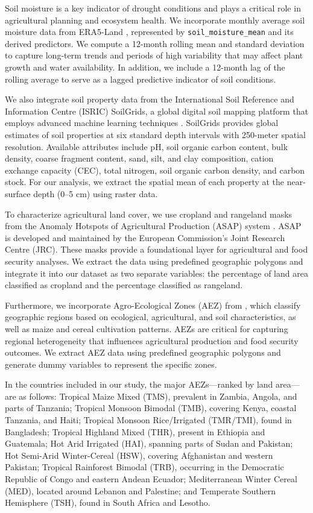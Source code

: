\documentclass[pdflatex,sn-mathphys-num]{sn-jnl}%
\theoremstyle{thmstyleone}%
\theoremstyle{thmstyletwo}%
\theoremstyle{thmstylethree}%
\begin{document}
Soil moisture is a key indicator of drought conditions and plays a critical role in agricultural planning and ecosystem health. We incorporate monthly average soil moisture data from ERA5-Land \cite{ECMWF_ERA5Land}, represented by \texttt{soil\_moisture\_mean} and its derived predictors. We compute a 12-month rolling mean and standard deviation to capture long-term trends and periods of high variability that may affect plant growth and water availability. In addition, we include a 12-month lag of the rolling average to serve as a lagged predictive indicator of soil conditions.

We also integrate soil property data from the International Soil Reference and Information Centre (ISRIC) SoilGrids, a global digital soil mapping platform that employs advanced machine learning techniques \cite{ISRIC_2024}. SoilGrids provides global estimates of soil properties at six standard depth intervals with 250-meter spatial resolution. Available attributes include pH, soil organic carbon content, bulk density, coarse fragment content, sand, silt, and clay composition, cation exchange capacity (CEC), total nitrogen, soil organic carbon density, and carbon stock. For our analysis, we extract the spatial mean of each property at the near-surface depth (0–5 cm) using raster data.

To characterize agricultural land cover, we use cropland and rangeland masks from the Anomaly Hotspots of Agricultural Production (ASAP) system \cite{JRC_ASAP_2024}. ASAP is developed and maintained by the European Commission's Joint Research Centre (JRC). These masks provide a foundational layer for agricultural and food security analyses. We extract the data using predefined geographic polygons and integrate it into our dataset as two separate variables: the percentage of land area classified as cropland and the percentage classified as rangeland.

Furthermore, we incorporate Agro-Ecological Zones (AEZ) from %
\cite{van2023worldcereal}, which classify geographic regions based on ecological, agricultural, and soil characteristics, as well as maize and cereal cultivation patterns. AEZs are critical for capturing regional heterogeneity that influences agricultural production and food security outcomes. We extract AEZ data using predefined geographic polygons and generate dummy variables to represent the specific zones.

In the countries included in our study, the major AEZs—ranked by land area—are as follows: Tropical Maize Mixed (TMS), prevalent in Zambia, Angola, and parts of Tanzania; Tropical Monsoon Bimodal (TMB), covering Kenya, coastal Tanzania, and Haiti; Tropical Monsoon Rice/Irrigated (TMR/TMI), found in Bangladesh; Tropical Highland Mixed (THR), present in Ethiopia and Guatemala; Hot Arid Irrigated (HAI), spanning parts of Sudan and Pakistan; Hot Semi-Arid Winter-Cereal (HSW), covering Afghanistan and western Pakistan; Tropical Rainforest Bimodal (TRB), occurring in the Democratic Republic of Congo and eastern Andean Ecuador; Mediterranean Winter Cereal (MED), located around Lebanon and Palestine; and Temperate Southern Hemisphere (TSH), found in South Africa and Lesotho.\\
\end{document}
